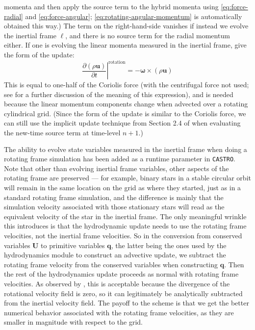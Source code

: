 \documentclass[twocolumn,numberedappendix]{../aastex6}
\newcommand{\castro}{\texttt{CASTRO}}
\begin{document}
momenta and then apply the source term to the hybrid momenta using \autoref{eq:force-radial} and
\autoref{eq:force-angular}; \autoref{eq:rotating-angular-momentum} is automatically obtained this way.)
The term on the right-hand-side vanishes if instead we evolve the inertial frame $\ell$, and there
is no source term for the radial momentum either. If one is evolving the linear momenta measured
in the inertial frame, \cite{byerly:2014} give the form of the update:
\begin{equation}
  \left.\frac{\partial (\rho \mathbf{u})}{\partial t}\right|^{\text{rotation}} = -{\bm{\omega}} \times (\rho \mathbf{u})
\end{equation}
This is equal to one-half of the Coriolis force (with the centrifugal force not used; see
\cite{call:2010} for a further discussion of the meaning of this expression),
and is needed because the linear momentum components change when advected over a
rotating cylindrical grid. (Since the form of the update is similar to the Coriolis force,
we can still use the implicit update technique from Section 2.4 of \cite{wdmergerI} when
evaluating the new-time source term at time-level $n+1$.)

The ability to evolve state variables measured in the inertial frame when doing a
rotating frame simulation has been added as a runtime parameter in \castro. Note that
other than evolving inertial frame variables, other aspects of the rotating frame are
preserved --- for example, binary stars in a stable circular orbit will remain in the same
location on the grid as where they started, just as in a standard rotating frame simulation,
and the difference is mainly that the simulation velocity associated with those stationary
stars will read as the equivalent velocity of the star in the inertial frame. The only
meaningful wrinkle this introduces is that the hydrodynamic update needs to use the
rotating frame velocities, not the inertial frame velocities. So in the conversion from
conserved variables $\mathbf{U}$ to primitive variables $\mathbf{q}$, the latter being
the ones used by the hydrodynamics module to construct an advective update, we subtract
the rotating frame velocity from the conserved variables when constructing $\mathbf{q}$.
Then the rest of the hydrodynamics update proceeds as normal with rotating frame velocities.
As observed by \citet{byerly:2014}, this is acceptable because the divergence of the
rotational velocity field is zero, so it can legitimately be analytically subtracted
from the inertial velocity field. The payoff to the scheme is that we get the better
numerical behavior associated with the rotating frame velocities, as they are smaller
in magnitude with respect to the grid.
\end{document}

